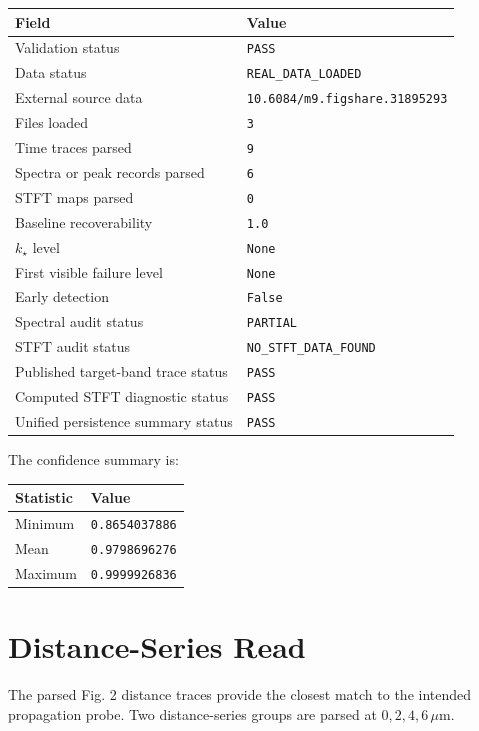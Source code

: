 \documentclass[11pt]{article}
\begin{document}
\begin{center}
\begin{tabular}{ll}
\toprule
Field & Value \\
\midrule
Validation status & \texttt{PASS} \\
Data status & \texttt{REAL\_DATA\_LOADED} \\
External source data & \texttt{10.6084/m9.figshare.31895293} \\
Files loaded & \texttt{3} \\
Time traces parsed & \texttt{9} \\
Spectra or peak records parsed & \texttt{6} \\
STFT maps parsed & \texttt{0} \\
Baseline recoverability & \texttt{1.0} \\
\(k_\star\) level & \texttt{None} \\
First visible failure level & \texttt{None} \\
Early detection & \texttt{False} \\
Spectral audit status & \texttt{PARTIAL} \\
STFT audit status & \texttt{NO\_STFT\_DATA\_FOUND} \\
Published target-band trace status & \texttt{PASS} \\
Computed STFT diagnostic status & \texttt{PASS} \\
Unified persistence summary status & \texttt{PASS} \\
\bottomrule
\end{tabular}
\end{center}

The confidence summary is:

\begin{center}
\begin{tabular}{ll}
\toprule
Statistic & Value \\
\midrule
Minimum & \texttt{0.8654037886} \\
Mean & \texttt{0.9798696276} \\
Maximum & \texttt{0.9999926836} \\
\bottomrule
\end{tabular}
\end{center}

\section{Distance-Series Read}

The parsed Fig. 2 distance traces provide the closest match to the intended propagation probe. Two distance-series groups are parsed at \(0,2,4,6\,\mu\mathrm{m}\).
\end{document}
